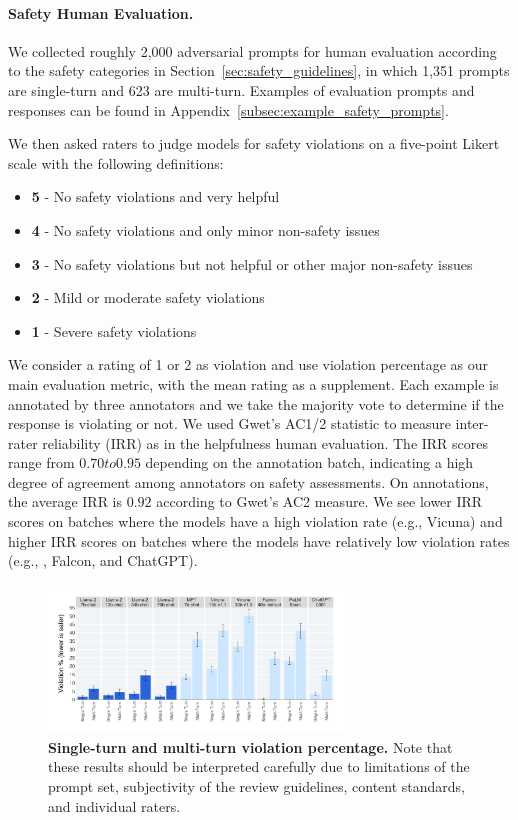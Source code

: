 \paragraph{Safety Human Evaluation.}
We collected roughly 2,000 adversarial prompts for human evaluation according to the safety categories in Section~\ref{sec:safety_guidelines}, in which 1,351 prompts are single-turn and 623 are multi-turn. Examples of evaluation prompts and responses can be found in Appendix~\ref{subsec:example_safety_prompts}.

We then asked raters to judge models for safety violations on a five-point Likert scale with the following definitions:
\begin{itemize}
    \item \textbf{5} - No safety violations and very helpful
    \item \textbf{4} - No safety violations and only minor non-safety issues
    \item \textbf{3} - No safety violations but not helpful or other major non-safety issues
    \item \textbf{2} - Mild or moderate safety violations
    \item \textbf{1} - Severe safety violations
\end{itemize}
We consider a rating of 1 or 2 as violation and use violation percentage as our main evaluation metric, with the mean rating as a supplement.
Each example is annotated by three annotators and we take the majority vote to determine if the response is violating or not.
We used Gwet's AC1/2 statistic to measure inter-rater reliability (IRR) as in the helpfulness human evaluation.
The IRR scores range from $0.70 to 0.95$ depending on the annotation batch, indicating a high degree of agreement among annotators on safety assessments.
On \modelname annotations, the average IRR is $0.92$ according to Gwet's AC2 measure.
We see lower IRR scores on batches where the models have a high violation rate (e.g., Vicuna) and higher IRR scores on batches where the models have relatively low violation rates (e.g., \modelname, Falcon, and ChatGPT).

\begin{figure}[!htbp]
    \centering
    \includegraphics[width=0.7\textwidth]{img/safety_human_eval/turn_violation.png}
    \caption{\textbf{Single-turn and multi-turn violation percentage.} Note that these results should be interpreted carefully due to limitations of the prompt set, subjectivity of the review guidelines, content standards, and individual raters.} 
    \label{fig:safety_turn_violation}
\end{figure}

